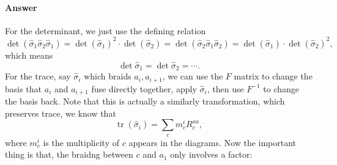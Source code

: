 \documentclass{book}
\begin{document}
\paragraph{Answer}
For the determinant, we just use the defining relation
\begin{equation*}
\det(\hat{\sigma }_{1}\hat{\sigma }_{2}\hat{\sigma }_{1}) =\det (\hat{\sigma }_{1} )^{2} \cdot \det(\hat{\sigma }_{2}) =\det (\hat{\sigma }_{2}\hat{\sigma }_{1}\hat{\sigma }_{2} )=\det (\hat{\sigma }_{1} )\cdot \det(\hat{\sigma }_{2})^{2} ,
\end{equation*}
which means 
\begin{equation*}
\det\hat{\sigma }_{1} =\det\hat{\sigma }_{2} =\cdots .
\end{equation*}
For the trace, say $\hat{\sigma }_{i}$ which braids $a_{i} ,a_{i+1}$, we can use the $F$ matrix to change the basis that $a_{i}$ and $a_{i+1}$ fuse directly together, apply $\hat{\sigma }_{i}$, then use $F^{-1}$ to change the basis back. Note that this is actually a similarly transformation, which preserves trace, we know that
\begin{equation*}
\operatorname{tr}(\hat{\sigma }_{i}) =\sum _{c} m_{c}^{i} R_{c}^{aa} ,
\end{equation*}
where $m_{c}^{i}$ is the multiplicity of $c$ appears in the diagrams. Now the important thing is that, the braidng between $c$ and $a_{1}$ only involves a factor:
\end{document}
